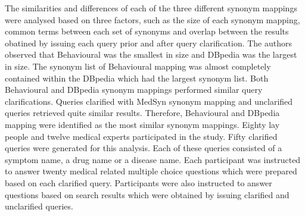 \documentclass[]{article}
\begin{document}
The similarities and differences of each of the three different synonym mappings were analysed based on three factors, such as the size of each synonym mapping, common terms between each set of synonyms and overlap between the results obatined by issuing each query prior and after query clarification.  The authors observed that Behavioural was the smallest in size and DBpedia was the largest in size. The synonym list of Behavioural mapping was almost completely contained within the DBpedia which had the largest synonym list.  Both Behavioural and DBpedia synonym mappings performed similar query clarifications. Queries clarified with MedSyn synonym mapping and unclarified queries retrieved quite similar results. Therefore, Behavioural and DBpedia mapping were identified as the most similar synonym mappings. Eighty lay people and  twelve medical experts participated in the study.  Fifty clarified queries were generated for this analysis. Each of these queries consisted of a symptom name, a drug name or a disease name. Each participant was instructed to answer twenty medical related multiple choice questions which were prepared based on each clarified query. Participants were also instructed to answer questions based on search results which were obtained by issuing clarified  and unclarified queries.
\end{document}
